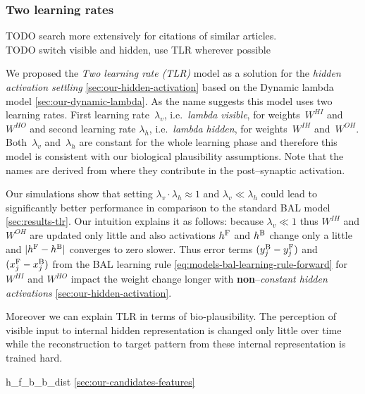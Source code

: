 
\subsubsection{Two learning rates} 
\label{sec:our-tlr}

TODO search more extensively for citations of similar articles. \\
TODO switch visible and hidden, use TLR wherever possible 

We proposed the \emph{Two learning rate (TLR)} model as a solution for the \emph{hidden activation settling} \ref{sec:our-hidden-activation} based on the Dynamic lambda model \ref{sec:our-dynamic-lambda}. As the name suggests this model uses two learning rates. First learning rate~$\lambda_v$, i.e.~\emph{lambda visible}, for weights~$W^{HI}$ and~$W^{HO}$ and second learning rate $\lambda_h$, i.e.~\emph{lambda hidden}, for weights~$W^{IH}$ and~$W^{OH}$. Both~$\lambda_v$ and~$\lambda_h$ are constant for the whole learning phase and therefore this model is consistent with our biological plausibility assumptions. Note that the names are derived from where they contribute in the post--synaptic activation. 

Our simulations show that setting $\lambda_v \cdot \lambda_h \approx 1$ and $\lambda_v \ll \lambda_h$ could lead to significantly better performance in comparison to the standard BAL model \ref{sec:results-tlr}. Our intuition explains it as follows: because $\lambda_v \ll 1$ thus $W^{IH}$ and $W^{OH}$ are updated only little and also activations $h^{\rm F}$ and $h^{\rm B}$ change only a little and $|h^{\rm F}- h^{\rm B}|$ converges to zero slower. Thus error terms $(y_j^{\rm B} - y_j^{\rm F})$ and $(x_j^{\rm F} - x_j^{\rm B})$ from the BAL learning rule \ref{eq:models-bal-learning-rule-forward} for $W^{HI}$ and $W^{HO}$ impact the weight change longer with {\bf non}--\emph{constant hidden activations} \ref{sec:our-hidden-activation}. 

Moreover we can explain TLR in terms of bio-plausibility. The perception of visible input to internal hidden representation is changed only little over time while the reconstruction to target pattern from these internal representation is trained hard. 

h\_f\_b\_b\_dist \ref{sec:our-candidates-features}


